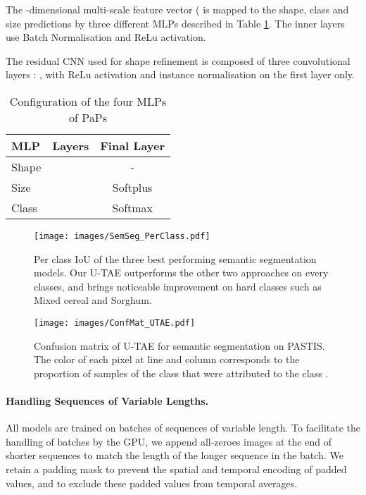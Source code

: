 The -dimensional multi-scale feature vector ( is mapped to the shape, class and size predictions by three different MLPs described in Table \ref{tab:mlp_config}. The inner layers use Batch Normalisation and ReLu activation.

{The residual CNN used for shape refinement is composed of three convolutional layers : , with ReLu activation and instance normalisation on the first layer only.}
\begin{table}[]
    \caption{Configuration of the four MLPs of PaPs}

    \centering
    \begin{tabular}{l|lc}
        MLP & Layers & Final Layer\\\midrule
        Shape &  & - \\
        Size &  & Softplus\\
        Class &  & Softmax\\
    \end{tabular}
    \label{tab:mlp_config}
\end{table}

\begin{figure}[h!]
    \centering
    \texttt{[image: images/SemSeg\_PerClass.pdf]}
    \caption{Per class IoU of the three best performing semantic segmentation models. Our U-TAE outperforms the other two approaches on every classes, and brings noticeable improvement on hard classes such as Mixed cereal and Sorghum. }
    \label{fig:per_class}
\end{figure}


\begin{figure}[h!]
    \centering
    \texttt{[image: images/ConfMat\_UTAE.pdf]}
    \caption{Confusion matrix of U-TAE for semantic segmentation on PASTIS. The color of each pixel at line  and column  corresponds to the proportion of samples of the class   that were attributed to the class .}
    \label{fig:confmat}
\end{figure}


\paragraph{Handling Sequences of Variable Lengths.} All models are trained on batches of sequences of variable length.
To facilitate the handling of batches by the GPU, we append all-zeroes images at the end of shorter sequences to match the length of the longer sequence in the batch.
We retain a padding mask to prevent the spatial and temporal encoding of padded values, and to exclude these padded values from temporal averages.


